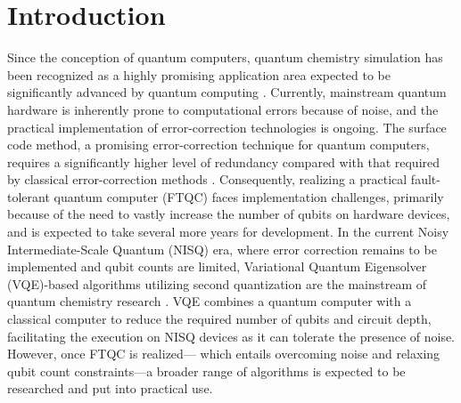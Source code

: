 \documentclass[jctc-draft.tex]{subfiles}
\begin{document}
\section{Introduction}
Since the conception of quantum computers, quantum chemistry simulation has been
recognized as a highly promising application area expected to be significantly
advanced by quantum computing \cite{Cao2019.doi:10.1021/acs.chemrev.8b00803}.
Currently, mainstream quantum hardware is inherently prone to computational
errors because of noise, and the practical implementation of error-correction
technologies is ongoing. The surface code method, a promising error-correction
technique for quantum computers, requires a significantly higher level of
redundancy compared with that required by classical error-correction methods
\cite{Fowler2012.PhysRevA.86.032324}. Consequently, realizing a practical
fault-tolerant quantum computer (FTQC) faces implementation challenges,
primarily because of the need to vastly increase the number of qubits on
hardware devices, and is expected to take several more years for development. In
the current Noisy Intermediate-Scale Quantum (NISQ) era, where error correction
remains to be implemented and qubit counts are limited, Variational Quantum
Eigensolver (VQE)-based algorithms utilizing second quantization are the
mainstream of quantum chemistry research \cite{peruzzo2014variational}. VQE
combines a quantum computer with a classical computer to reduce the required
number of qubits and circuit depth, facilitating the execution on NISQ devices
as it can tolerate the presence of noise. However, once FTQC is realized---
which entails overcoming noise  and relaxing qubit count constraints---a broader
range of algorithms is expected to be researched and put into practical use.
\end{document}
